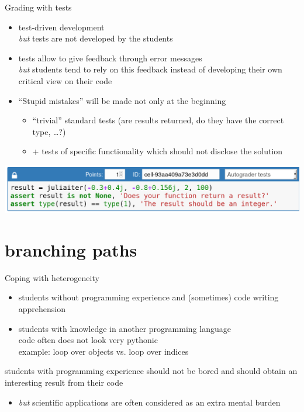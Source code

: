 \documentclass[svgnames]{beamer}
\newcommand\but{\alert{\textit{but}} }
\begin{document}
\begin{frame}{Grading with tests}
 \begin{itemize}
  \item test-driven development\\
	\but tests are not developed by the students
  \item tests allow to give feedback through error messages\\
	\but students tend to rely on this feedback instead of developing their
	own critical view on their code
  \item ``Stupid mistakes'' will be made not only at the beginning
	\begin{itemize}
         \item ``trivial'' standard tests (are results returned, do they have the correct type, \dots?)
	 \item + tests of specific functionality which should not disclose the solution
	\end{itemize}
 \end{itemize}
 \begin{center}
  \includegraphics[width=\textwidth]{answer_tests_unittest1}
 \end{center}
\end{frame}

\section{branching paths}

\begin{frame}
 \begin{center}
  \begin{minipage}{0.6\textwidth}
   \tableofcontents[currentsection]
  \end{minipage}
 \end{center}
\end{frame}

\begin{frame}{Coping with heterogeneity}
 \begin{itemize}
  \item students without programming experience and (sometimes) code writing apprehension
  \item students with knowledge in another programming language\\
	code often does not look very pythonic\\
	example: loop over objects vs. loop over indices
 \end{itemize}

 students with programming experience should not be bored and should obtain an interesting result from their code

 \begin{itemize}
  \item \but scientific applications are often considered as an extra mental burden
 \end{itemize}
\end{frame}
\end{document}
